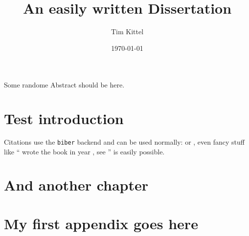 \documentclass{simple-dissertation}
\title{An easily written Dissertation}
\date{\today}
\author{Tim Kittel}
\begin{document}
\maketitle

\pagestyle{thesis-preface}


Some randome Abstract should be here.



\cleartorecto
\tableofcontents

\cleartorecto
\pagestyle{thesis}

\chapter{Test introduction}

Citations use the \verb|biber| backend and can be used normally: \cite{heitzig2016topology} or \citet{heitzig2016topology}, even fancy stuff like ``\citeauthor{kuznetsov1998elements} wrote the book  in year \citeyear{kuznetsov1998elements}, see \cite{kuznetsov1998elements}'' is easily possible.

\lipsum

\lipsum

\chapter{And another chapter}



\appendix
\chapter{My first appendix goes here}



\printbibliography
\end{document}

